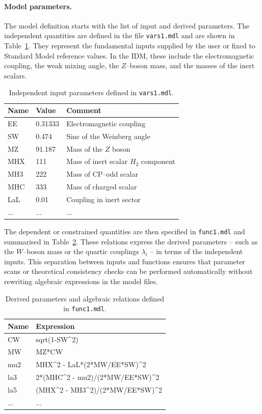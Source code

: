\documentclass[12pt,a4paper]{article}
\def\pw{\textasciicircum}
\begin{document}
\paragraph{Model parameters.}
The model definition starts with the list of input and derived parameters.  
The independent quantities are defined in the file \texttt{vars1.mdl} and are shown in Table~\ref{tab:variablesA}.  
They represent the fundamental inputs supplied by the user or fixed to Standard Model reference values.  
In the IDM, these include the electromagnetic coupling, the weak mixing angle, the $Z$--boson mass, and the masses of the inert scalars.

\begin{table}[htbp]
\centering
\begin{tabular}{l|l|l}
\textbf{Name} & \textbf{Value} & \textbf{Comment} \\
\hline
EE  & 0.31333 & Electromagnetic coupling \\
SW  & 0.474   & Sine of the Weinberg angle \\
MZ  & 91.187  & Mass of the $Z$ boson \\
MHX & 111     & Mass of inert scalar $H_2$ component \\
MH3 & 222     & Mass of CP--odd scalar \\
MHC & 333     & Mass of charged scalar \\
LaL & 0.01    & Coupling in inert sector \\
... & ...     & ...
\end{tabular}
\caption{Independent input parameters defined in \texttt{vars1.mdl}.}
\label{tab:variablesA}
\end{table}

The dependent or constrained quantities are then specified in \texttt{func1.mdl} and summarised in Table~\ref{tab:variablesB}.  
These relations express the derived parameters -- such as the $W$--boson mass or the quartic couplings $\lambda_i$ -- in terms of the independent inputs.  
This separation between inputs and functions ensures that parameter scans or theoretical consistency checks can be performed automatically without rewriting algebraic expressions in the model files.

\begin{table}[htbp]
\centering
\begin{tabular}{l|l}
\textbf{Name} & \textbf{Expression} \\
\hline
CW & sqrt(1-SW\pw2)\\
MW & MZ*CW \\
mu2 & MHX\pw2 - LaL*(2*MW/EE*SW)\pw2 \\
la3 & 2*(MHC\pw2 - mu2)/(2*MW/EE*SW)\pw2 \\
la5 & (MHX\pw2 - MH3\pw2)/(2*MW/EE*SW)\pw2 \\
... & ...
\end{tabular}
\caption{Derived parameters and algebraic relations defined in \texttt{func1.mdl}.}
\label{tab:variablesB}
\end{table}
\end{document}
